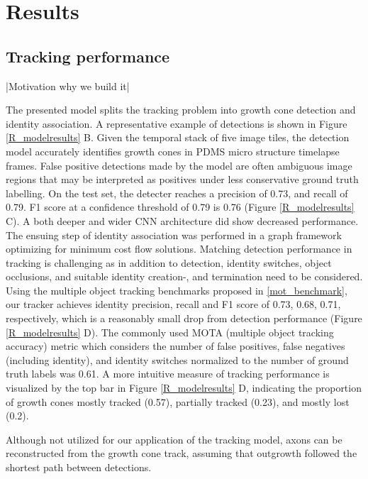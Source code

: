 \section{Results}
\subsection{Tracking performance}
|Motivation why we build it|

The presented model splits the tracking problem into growth cone detection and
identity association. A representative example of detections is shown in Figure
\ref{R_modelresults} B. Given the temporal stack of five image tiles, the
detection model accurately identifies growth cones in PDMS micro structure
timelapse frames. False positive detections made by the model are often
ambiguous image regions that may be interpreted as positives under less
conservative ground truth labelling. On the test set, the detecter reaches a
precision of 0.73, and recall of 0.79. F1 score at a confidence threshold of
0.79 is 0.76 (Figure \ref{R_modelresults} C). A both deeper and wider CNN
architecture did show decreased performance. The ensuing step of identity
association was performed in a graph framework optimizing for minimum cost flow
solutions. Matching detection performance in tracking is challenging as in
addition to detection, identity switches, object occlusions, and suitable
identity creation-, and termination need to be considered. Using the multiple
object tracking benchmarks proposed in \ref{mot_benchmark}, our tracker achieves
identity precision, recall and F1 score of 0.73, 0.68, 0.71, respectively, which
is a reasonably small drop from detection performance (Figure
\ref{R_modelresults} D). The commonly used MOTA (multiple object tracking
accuracy) metric which considers the number of false positives, false negatives
(including identity), and identity switches normalized to the number of ground
truth labels was 0.61. A more intuitive measure of tracking performance is
visualized by the top bar in Figure \ref{R_modelresults} D, indicating the
proportion of growth cones mostly tracked (0.57), partially tracked (0.23), and
mostly lost (0.2). 

Although not utilized for our application of the tracking model, axons can be
reconstructed from the growth cone track, assuming that outgrowth followed the
shortest path between detections. 



